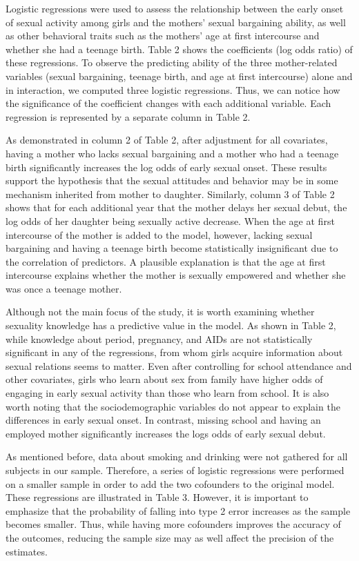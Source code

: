\documentclass[
]{article}
\begin{document}
Logistic regressions were used to assess the relationship between the
early onset of sexual activity among girls and the mothers' sexual
bargaining ability, as well as other behavioral traits such as the
mothers' age at first intercourse and whether she had a teenage birth.
Table 2 shows the coefficients (log odds ratio) of these regressions. To
observe the predicting ability of the three mother-related variables
(sexual bargaining, teenage birth, and age at first intercourse) alone
and in interaction, we computed three logistic regressions. Thus, we can
notice how the significance of the coefficient changes with each
additional variable. Each regression is represented by a separate column
in Table 2.

As demonstrated in column 2 of Table 2, after adjustment for all
covariates, having a mother who lacks sexual bargaining and a mother who
had a teenage birth significantly increases the log odds of early sexual
onset. These results support the hypothesis that the sexual attitudes
and behavior may be in some mechanism inherited from mother to daughter.
Similarly, column 3 of Table 2 shows that for each additional year that
the mother delays her sexual debut, the log odds of her daughter being
sexually active decrease. When the age at first intercourse of the
mother is added to the model, however, lacking sexual bargaining and
having a teenage birth become statistically insignificant due to the
correlation of predictors. A plausible explanation is that the age at
first intercourse explains whether the mother is sexually empowered and
whether she was once a teenage mother.

Although not the main focus of the study, it is worth examining whether
sexuality knowledge has a predictive value in the model. As shown in
Table 2, while knowledge about period, pregnancy, and AIDs are not
statistically significant in any of the regressions, from whom girls
acquire information about sexual relations seems to matter. Even after
controlling for school attendance and other covariates, girls who learn
about sex from family have higher odds of engaging in early sexual
activity than those who learn from school. It is also worth noting that
the sociodemographic variables do not appear to explain the differences
in early sexual onset. In contrast, missing school and having an
employed mother significantly increases the logs odds of early sexual
debut.

As mentioned before, data about smoking and drinking were not gathered
for all subjects in our sample. Therefore, a series of logistic
regressions were performed on a smaller sample in order to add the two
cofounders to the original model. These regressions are illustrated in
Table 3. However, it is important to emphasize that the probability of
falling into type 2 error increases as the sample becomes smaller. Thus,
while having more cofounders improves the accuracy of the outcomes,
reducing the sample size may as well affect the precision of the
estimates.
\end{document}
